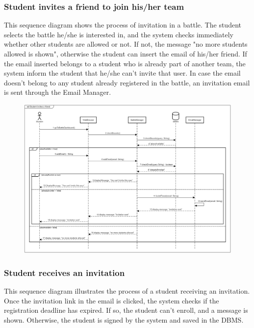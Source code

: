 \documentclass[12pt,oneside,a4paper]{article}
\begin{document}
\subsubsection{Student invites a friend to join his/her team}
This sequence diagram shows the process of invitation in a battle. The student selects the battle he/she is interested in, and the system checks immediately whether other students are allowed or not. If not, the message "no more students allowed is shown", otherwise the student can insert the email of his/her friend. If the email inserted belongs to a student who is already part of another team, the system inform the student that he/she can't invite that user. In case the email doesn't belong to any student already registered in the battle, an invitation email is sent through the Email Manager.

\begin{figure}[htbp]
    \centering
    \includegraphics[width=1\linewidth]{Images//Sequence Diagrams/studentInvitesFriend.png}
    \label{fig:enter-label}
\end{figure}
\clearpage

\subsubsection{Student receives an invitation}
This sequence diagram illustrates the process of a student receiving an invitation. Once the invitation link in the email is clicked, the system checks if the registration deadline has expired. If so, the student can't enroll, and a message is shown. Otherwise, the student is signed by the system and saved in the DBMS. 
\end{document}
